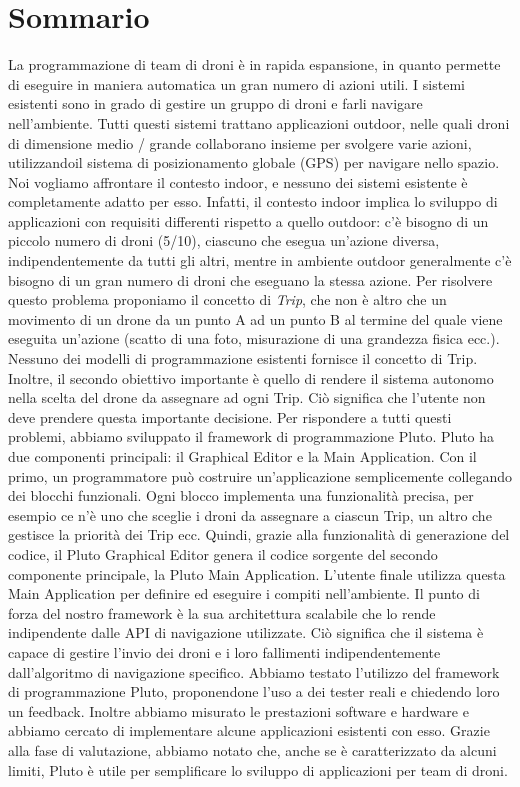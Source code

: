 \chapter*{Sommario}


La programmazione di team di droni è in rapida espansione, in quanto permette di eseguire in maniera automatica un gran numero di azioni utili.
I sistemi esistenti sono in grado di gestire un gruppo di droni e farli navigare nell'ambiente.
Tutti questi sistemi trattano applicazioni outdoor, nelle quali droni di dimensione medio / grande collaborano insieme per svolgere varie azioni, utilizzandoil sistema di posizionamento globale (GPS) per navigare nello spazio.
Noi vogliamo affrontare il contesto indoor, e nessuno dei sistemi esistente è completamente adatto per esso.
Infatti, il contesto indoor implica lo sviluppo di applicazioni con requisiti differenti rispetto a quello outdoor:
c'è bisogno di un piccolo numero di droni (5/10), ciascuno che esegua un'azione diversa, indipendentemente da tutti gli altri, mentre in ambiente outdoor generalmente c'è bisogno di un gran numero di droni che eseguano la stessa azione.
Per risolvere questo problema proponiamo il concetto di \textit{Trip}, che non è altro che un movimento di un drone da un punto A ad un punto B al termine del quale viene eseguita un'azione (scatto di una foto, misurazione di una grandezza fisica ecc.).
Nessuno dei modelli di programmazione esistenti fornisce il concetto di Trip.
Inoltre, il secondo obiettivo importante è quello di rendere il sistema autonomo nella scelta del drone da assegnare ad ogni Trip.
Ciò significa che l'utente non deve prendere questa importante decisione.
Per rispondere a tutti questi problemi, abbiamo sviluppato il framework di programmazione Pluto.
Pluto ha due componenti principali: il Graphical Editor e la Main Application.
Con il primo, un programmatore può costruire un'applicazione semplicemente collegando dei blocchi funzionali.
Ogni blocco implementa una funzionalità precisa, per esempio ce n'è uno che sceglie i droni da assegnare a ciascun Trip, un altro che gestisce la priorità dei Trip ecc.
Quindi, grazie alla funzionalità di generazione del codice, il Pluto Graphical Editor genera il codice sorgente del secondo componente principale, la Pluto Main Application.
L'utente finale utilizza questa Main Application per definire ed eseguire i compiti nell'ambiente.
Il punto di forza del nostro framework è la sua architettura scalabile che lo rende indipendente dalle API di navigazione utilizzate.
Ciò significa che il sistema è capace di gestire l'invio dei droni e i loro fallimenti indipendentemente dall'algoritmo di navigazione specifico.
Abbiamo testato l'utilizzo del framework di programmazione Pluto, proponendone l'uso a dei tester reali e chiedendo loro un feedback.
Inoltre abbiamo misurato le prestazioni software e hardware e abbiamo cercato di implementare alcune applicazioni esistenti con esso.
Grazie alla fase di valutazione, abbiamo notato che, anche se è caratterizzato da alcuni limiti, Pluto è utile per semplificare lo sviluppo di applicazioni per team di droni.